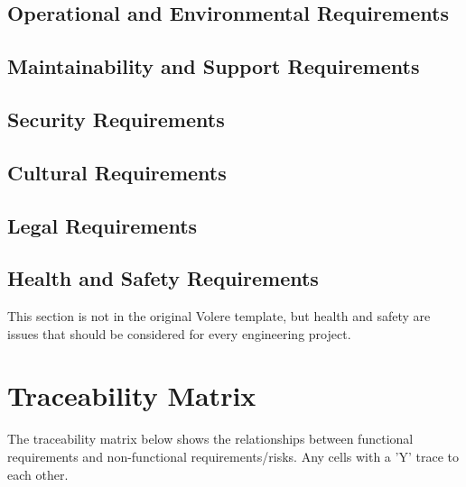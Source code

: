 \documentclass{article}
\begin{document}
\subsection{Operational and Environmental Requirements}

\subsection{Maintainability and Support Requirements}

\subsection{Security Requirements}

\subsection{Cultural Requirements}

\subsection{Legal Requirements}

\subsection{Health and Safety Requirements}

This section is not in the original Volere template, but health and safety are
issues that should be considered for every engineering project.

\section{Traceability Matrix}

The traceability matrix below shows the relationships between functional requirements and non-functional requirements/risks. Any cells with a 'Y' trace to each other. 
\end{document}
